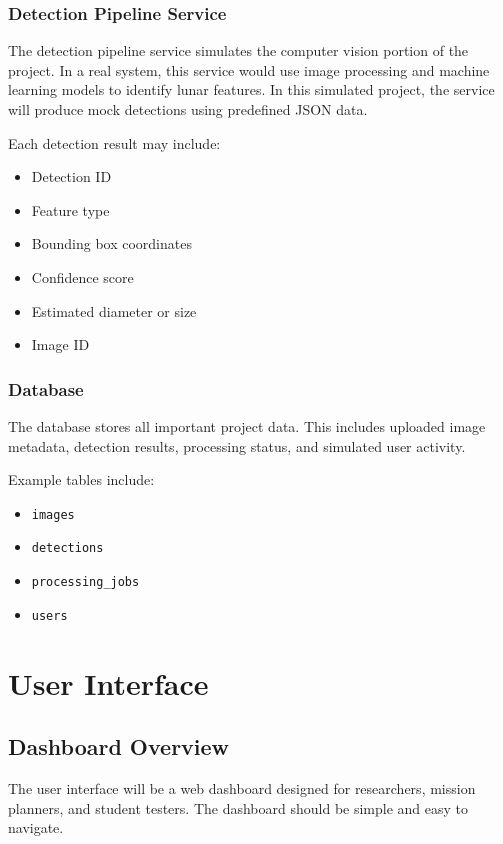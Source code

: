 \documentclass[12pt]{article}
\begin{document}
\subsubsection{Detection Pipeline Service}

The detection pipeline service simulates the computer vision portion of the project. In a real system, this service would use image processing and machine learning models to identify lunar features. In this simulated project, the service will produce mock detections using predefined JSON data.

Each detection result may include:

\begin{itemize}
    \item Detection ID
    \item Feature type
    \item Bounding box coordinates
    \item Confidence score
    \item Estimated diameter or size
    \item Image ID
\end{itemize}

\subsubsection{Database}

The database stores all important project data. This includes uploaded image metadata, detection results, processing status, and simulated user activity.

Example tables include:

\begin{itemize}
    \item \texttt{images}
    \item \texttt{detections}
    \item \texttt{processing\_jobs}
    \item \texttt{users}
\end{itemize}

\section{User Interface}

\subsection{Dashboard Overview}

The user interface will be a web dashboard designed for researchers, mission planners, and student testers. The dashboard should be simple and easy to navigate.
\end{document}
